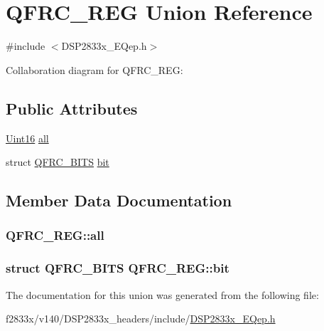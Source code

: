 \hypertarget{union_q_f_r_c___r_e_g}{}\section{Q\+F\+R\+C\+\_\+\+R\+E\+G Union Reference}
\label{union_q_f_r_c___r_e_g}


{\ttfamily \#include $<$D\+S\+P2833x\+\_\+\+E\+Qep.\+h$>$}



Collaboration diagram for Q\+F\+R\+C\+\_\+\+R\+E\+G\+:
\subsection*{Public Attributes}
\begin{DoxyCompactItemize}
\item 
\hyperlink{_d_s_p2833x___device_8h_a59a9f6be4562c327cbfb4f7e8e18f08b}{Uint16} \hyperlink{union_q_f_r_c___r_e_g_a808d70687b25a2ef2ac1909f7a7e2dad}{all}
\item 
struct \hyperlink{struct_q_f_r_c___b_i_t_s}{Q\+F\+R\+C\+\_\+\+B\+I\+T\+S} \hyperlink{union_q_f_r_c___r_e_g_a44ba13887583e70d5671a3179021dea2}{bit}
\end{DoxyCompactItemize}


\subsection{Member Data Documentation}
\hypertarget{union_q_f_r_c___r_e_g_a808d70687b25a2ef2ac1909f7a7e2dad}{}
\subsubsection[{all}]{ Q\+F\+R\+C\+\_\+\+R\+E\+G\+::all}\label{union_q_f_r_c___r_e_g_a808d70687b25a2ef2ac1909f7a7e2dad}
\hypertarget{union_q_f_r_c___r_e_g_a44ba13887583e70d5671a3179021dea2}{}
\subsubsection[{bit}]{\setlength{\rightskip}{0pt plus 5cm}struct {\bf Q\+F\+R\+C\+\_\+\+B\+I\+T\+S} Q\+F\+R\+C\+\_\+\+R\+E\+G\+::bit}\label{union_q_f_r_c___r_e_g_a44ba13887583e70d5671a3179021dea2}


The documentation for this union was generated from the following file\+:\begin{DoxyCompactItemize}
\item 
f2833x/v140/\+D\+S\+P2833x\+\_\+headers/include/\hyperlink{_d_s_p2833x___e_qep_8h}{D\+S\+P2833x\+\_\+\+E\+Qep.\+h}\end{DoxyCompactItemize}
